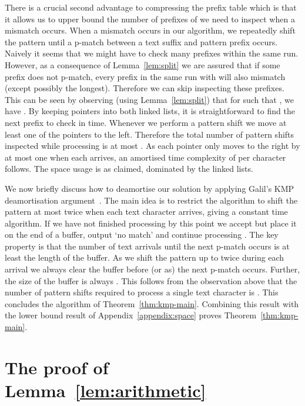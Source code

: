 \documentclass[11pt,a4paper]{article}
\theoremstyle{theorem}
\newcommand{\pmatch}{\mbox{p-match}\xspace}
\begin{document}
There is a crucial second advantage to compressing the prefix table which is that it allows us to upper bound the number of prefixes of  we need to inspect when a mismatch occurs. When a mismatch occurs in our algorithm, we repeatedly shift the pattern until a \pmatch between a text suffix and pattern prefix occurs. Naively it seems that we might have to check many prefixes within the same run.
However, as a consequence of Lemma~\ref{lem:split}
we are assured that if some prefix does not \pmatch, every prefix in the same run  with  will also mismatch (except possibly the longest). Therefore we can skip inspecting these prefixes.
This can be seen by observing (using Lemma~\ref{lem:split}) that for  such that , we have .
By keeping pointers into both linked lists, it is straightforward to find the next prefix to check in  time.
Whenever we perform a pattern shift we move at least one of the pointers to the left. Therefore the total number of pattern shifts inspected while processing  is at most . As each pointer only moves to the right by at most one when each  arrives, an amortised time complexity of  per character follows. The space usage is  as claimed, dominated by the linked lists.




We now briefly discuss how to deamortise our solution by applying Galil's KMP deamortisation argument~\cite{Galil:1981}. The main idea is to restrict the algorithm to shift the pattern at most twice when each text character arrives, giving a constant time algorithm. If we have not finished processing  by this point we accept  but place it on the end of a buffer, output `no match' and continue processing . The key property is that the number of text arrivals until the next \pmatch occurs is at least the length of the buffer. As we shift the pattern up to twice during each arrival we always clear the buffer before (or as) the next \pmatch occurs. Further, the size of the buffer is always . This follows from the observation above that the number of pattern shifts required to process a single text character is .
This concludes the algorithm of Theorem~\ref{thm:kmp-main}. Combining this result with the lower bound result of Appendix~\ref{appendix:space} proves Theorem~\ref{thm:kmp-main}.





\section{The proof of Lemma~\ref{lem:arithmetic}}\label{sec:arithmetic-proof}
\end{document}
